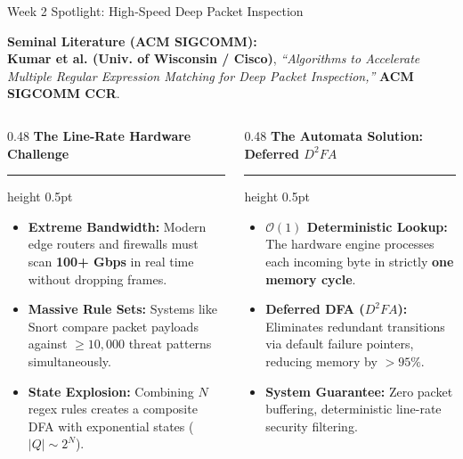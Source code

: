 \documentclass[aspectratio=169, 10pt]{beamer}
\newcommand{\colheader}[1]{%
  {\noindent\footnotesize\bfseries\color{gimpanavy}#1}%
  \vspace{0.03cm}%
  {\color{gimpanavy!30}\hrule height 0.5pt}%
  \vspace{0.08cm}%
}
\begin{document}
\begin{frame}{Week 2 Spotlight: High-Speed Deep Packet Inspection}
  \begin{tcolorbox}[spotlightcard]
    \footnotesize
    \textbf{Seminal Literature (ACM SIGCOMM):} \\
    \textbf{Kumar et al. (Univ. of Wisconsin / Cisco)}, \textit{``Algorithms to Accelerate Multiple Regular Expression Matching for Deep Packet Inspection,''} \textbf{ACM SIGCOMM CCR}.
  \end{tcolorbox}

  \vspace{0.06cm}
  \begin{columns}[T]
    \begin{column}{0.48\textwidth}
      \colheader{The Line-Rate Hardware Challenge}
      \begin{tcolorbox}[alertcard]
        \begin{itemize}\setlength{\itemsep}{2.5pt}\scriptsize
          \item \textbf{Extreme Bandwidth:} Modern edge routers and firewalls must scan \textbf{100+ Gbps} in real time without dropping frames.
          \item \textbf{Massive Rule Sets:} Systems like Snort compare packet payloads against $\ge 10,000$ threat patterns simultaneously.
          \item \textbf{State Explosion:} Combining $N$ regex rules creates a composite DFA with exponential states ($|Q| \sim 2^N$).
        \end{itemize}
      \end{tcolorbox}
    \end{column}

    \hfill

    \begin{column}{0.48\textwidth}
      \colheader{The Automata Solution: Deferred $D^2FA$}
      \begin{tcolorbox}[conceptcard]
        \begin{itemize}\setlength{\itemsep}{2.5pt}\scriptsize
          \item \textbf{$\mathcal{O}(1)$ Deterministic Lookup:} The hardware engine processes each incoming byte in strictly \textbf{one memory cycle}.
          \item \textbf{Deferred DFA ($D^2FA$):} Eliminates redundant transitions via default failure pointers, reducing memory by \textbf{$>95\%$}.
          \item \textbf{System Guarantee:} Zero packet buffering, deterministic line-rate security filtering.
        \end{itemize}
      \end{tcolorbox}
    \end{column}
  \end{columns}
\end{frame}
\end{document}
